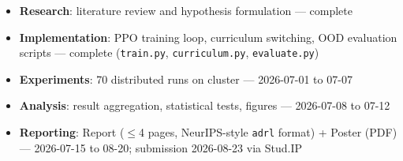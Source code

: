 \documentclass{article}
\begin{document}
\begin{itemize}
    \item \textbf{Research}: literature review and hypothesis formulation --- complete
    \item \textbf{Implementation}: PPO training loop, curriculum switching, OOD evaluation scripts --- complete (\texttt{train.py}, \texttt{curriculum.py}, \texttt{evaluate.py})
    \item \textbf{Experiments}: 70 distributed runs on cluster --- 2026-07-01 to 07-07
    \item \textbf{Analysis}: result aggregation, statistical tests, figures --- 2026-07-08 to 07-12
    \item \textbf{Reporting}: Report ($\leq$4 pages, NeurIPS-style \texttt{adrl} format) + Poster (PDF) --- 2026-07-15 to 08-20; submission 2026-08-23 via Stud.IP
\end{itemize}
\end{document}
